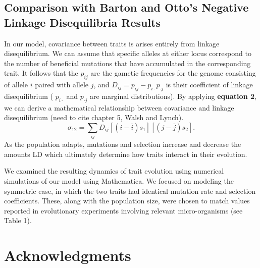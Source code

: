 \documentclass[11pt,twocolumn]{article}
\begin{document}
\subsection*{Comparison with Barton and Otto's Negative Linkage Disequilibria Results}
In our model, covariance between traits is arises entirely from linkage disequilibrium. We can assume that specific alleles at either locus correspond to the number of beneficial mutations that have accumulated in the corresponding trait.  It follows that the $p_{ij}$ are the gametic frequencies for the genome consisting of allele $i$ paired with allele $j$, and $D_{ij} = p_{ij}-p_{i\cdot} p_{\cdot j}$ is their coefficient of linkage disequilibrium ( $p_{i\cdot}$ and $p_{\cdot j}$ are marginal distributions). By applying \textbf{equation 2}, we can derive a mathematical relationship between covariance and linkage disequilibrium (need to cite chapter 5, Walsh and Lynch).
% 
% 
\begin{equation}
\sigma_{12}=\sum_{ij}D_{ij}[(i-\bar{i})s_1][(j-\bar{j})s_2]. 
\end{equation} 
As the population adapts, mutations and selection  increase and decrease the amounts LD which ultimately determine how traits interact in their evolution.\par

We examined the resulting dynamics of trait evolution using numerical simulations of our model using Mathematica. We focused on modeling the symmetric case, in which the two traits had identical mutation rate and selection coefficients. These, along with the population size, were chosen to match values reported in evolutionary experiments involving relevant micro-organisms (see Table 1). 

\section*{Acknowledgments}
\label{sec:acknowledgments}



\end{document}

